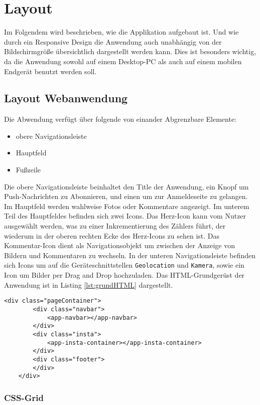 \chapter{Layout}

Im Folgendem wird beschrieben, wie die Applikation aufgebaut ist. Und wie durch ein Responsive Design die Anwendung auch unabhängig von der Bildschirmgröße übersichtlich dargestellt werden kann. Dies ist besonders wichtig, da die Anwendung sowohl auf einem Desktop-PC als auch auf einem mobilen Endgerät benutzt werden soll. 

\section{Layout Webanwendung}
Die Abwendung verfügt über folgende von einander Abgrenzbare Elemente: 
\begin{itemize}
    \item obere Navigationsleiste
    \item Hauptfeld
    \item Fußzeile
\end{itemize}

Die obere Navigationsleiste beinhaltet den Title der Anwendung, ein Knopf um Push-Nachrichten zu Abonnieren, und einen um zur Anmeldeseite zu gelangen. Im Hauptfeld werden wahlweise Fotos oder Kommentare angezeigt. Im unterem Teil des Hauptfeldes befinden sich zwei Icons. Das Herz-Icon kann vom Nutzer ausgewählt werden, was zu einer Inkrementierung des Zählers führt, der wiederum in der oberen rechten Ecke des Herz-Icons zu sehen ist. Das Kommentar-Icon dient als Navigationsobjekt um zwischen der Anzeige von Bildern und Kommentaren zu wechseln. In der unteren Navigationsleiste befinden sich Icons um auf die Geräteschnittstellen \texttt{Geolocation} und \texttt{Kamera}, sowie ein Icon um Bilder per Drag and Drop hochzuladen.  Das HTML-Grundgerüst der Anwendung ist in Listing \ref{lst:grundHTML} dargestellt. 

\begin{lstlisting}[caption={HTML-Grundgerüst der Webanwendung}, label=lst:grundHTML, float=!htb]
    <div class="pageContainer">
        <div class="navbar">
            <app-navbar></app-navbar>
        </div>
        <div class="insta">
            <app-insta-container></app-insta-container>
        </div>
        <div class="footer">
        </div>
    </div>
\end{lstlisting}

\subsection{CSS-Grid}

